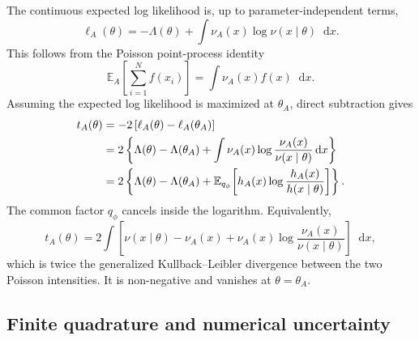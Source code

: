 \documentclass[
  aps,
  prd,
  superscriptaddress,
  nofootinbib,
  longbibliography,
  12pt
]{revtex4-2}
\newcommand{\dd}{\mathop{}\!\mathrm{d}}
\newcommand{\E}{\mathbb{E}}
\newcommand{\qRef}{q_{\phi}}
\begin{document}
The continuous expected log likelihood is, up to parameter-independent terms,
\begin{equation}
  \ell_A(\theta)
  =-\Lambda(\theta)
  +\int\nu_A(x)\log\nu(x\mid\theta)\dd x.
  \label{eq:expected-loglikelihood}
\end{equation}
This follows from the Poisson point-process identity
\begin{equation}
  \E_A\!\left[\sum_{i=1}^{N}f(x_i)\right]
  =\int\nu_A(x)f(x)\dd x.
  \label{eq:poisson-point-identity}
\end{equation}
Assuming the expected log likelihood is maximized at $\theta_A$, direct subtraction gives
\begin{align}
  t_A(\theta)
  &=-2\left[\ell_A(\theta)-\ell_A(\theta_A)\right]\notag\\
  &=2\left\{\Lambda(\theta)-\Lambda(\theta_A)
  +\int\nu_A(x)
  \log\frac{\nu_A(x)}{\nu(x\mid\theta)}\dd x\right\}\notag\\
  &=2\left\{\Lambda(\theta)-\Lambda(\theta_A)
  +\E_{\qRef}\!\left[
  h_A(x)\log\frac{h_A(x)}{h(x\mid\theta)}
  \right]\right\}.
  \label{eq:expected-test-statistic}
\end{align}
The common factor $\qRef$ cancels inside the logarithm.  Equivalently,
\begin{equation}
  t_A(\theta)=2\int\left[
  \nu(x\mid\theta)-\nu_A(x)
  +\nu_A(x)\log\frac{\nu_A(x)}{\nu(x\mid\theta)}
  \right]\dd x,
  \label{eq:poisson-kl}
\end{equation}
which is twice the generalized Kullback--Leibler divergence between the two Poisson intensities.  It is non-negative and vanishes at $\theta=\theta_A$.

\subsection{Finite quadrature and numerical uncertainty}
\label{sec:asimov-uncertainty}
\end{document}
